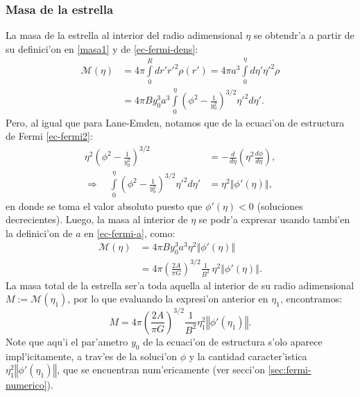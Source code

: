 \subsubsection{Masa de la estrella}

La masa de la estrella al interior del radio adimensional $\eta$ se obtendr'a a partir de su definici'on en \eqref{masa1} y de \eqref{ec-fermi-dens}:
\begin{align}
 \mathcal{M}(\eta)&=4\pi\int\limits^R_{0}dr'r'^2\rho(r')=4\pi a^3\int\limits^{\eta}_{0}d\eta' \eta'^2\rho\\
&=4\pi B y_0^3 a^3\int\limits^{\eta}_{0} \left(\phi^2-\frac{1}{y_0^2}\right)^{3/2}\eta'^2d\eta'.
\end{align}
Pero, al igual que para Lane-Emden, notamos que de la ecuaci'on de estructura de Fermi  \eqref{ec-fermi2}:
\begin{align}
 \eta^2\left(\phi^2-\frac{1}{y_0^2}\right)^{3/2}&=-\frac{d}{d\eta}\left(\eta^2\frac{d\phi}{d\eta}\right),\\
\Rightarrow\quad \int\limits^{\eta}_{0} \left(\phi^2-\frac{1}{y_0^2}\right)^{3/2}\eta'^2d\eta'&=\eta^2\left\Vert\phi'(\eta)\right\Vert,
\end{align}
en donde se toma el valor absoluto puesto que $\phi'(\eta)<0$ (soluciones decrecientes). Luego, la masa al interior de $\eta$ se podr'a expresar usando tambi'en la definici'on de $a$ en \eqref{ec-fermi-a}, como:
\begin{align}
\mathcal{M}(\eta)&=4\pi B y_0^3 a^3\eta^2\left\Vert\phi'(\eta)\right\Vert\label{ec-fermi-masaparcial1}\\
&=4\pi\left(\frac{2A}{\pi G}\right)^{3/2}\frac{1}{B^2}\,\eta^2\left\Vert\phi'(\eta)\right\Vert\label{ec-fermi-masaparcial2}.
\end{align}
La masa total  de la estrella ser'a toda aquella al interior de su radio adimensional $M:=\mathcal{M}(\eta_1)$, por lo que evaluando la expresi'on anterior en $\eta_1$, encontramos:
\begin{equation}\label{ec-fermi-masatotal}
\boxed{
 M=4\pi\left(\frac{2A}{\pi G}\right)^{3/2}\frac{1}{B^2}\eta_1^2\left\Vert\phi'(\eta_1)\right\Vert.}
\end{equation}
Note que aqu'i el par'ametro $y_0$ de la ecuaci'on de estructura s'olo aparece impl'icitamente, a trav'es de la soluci'on $\phi$ y la cantidad caracter'istica $\eta_1^2\left\Vert\phi'(\eta_1)\right\Vert$, que se encuentran num'ericamente (ver secci'on \eqref{sec:fermi-numerico}).

